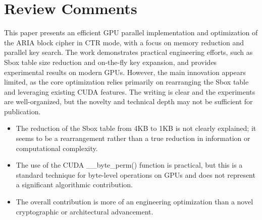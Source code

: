 \documentclass[a4paper]{article}
\begin{document}
\section{Review Comments}

This paper presents an efficient GPU parallel implementation and optimization of the ARIA block cipher in CTR mode, with a focus on memory reduction and parallel key search. The work demonstrates practical engineering efforts, such as Sbox table size reduction and on-the-fly key expansion, and provides experimental results on modern GPUs. However, the main innovation appears limited, as the core optimization relies primarily on rearranging the Sbox table and leveraging existing CUDA features. The writing is clear and the experiments are well-organized, but the novelty and technical depth may not be sufficient for publication.

\begin{itemize}
  \item The reduction of the Sbox table from 4KB to 1KB is not clearly explained; it seems to be a rearrangement rather than a true reduction in information or computational complexity.
  \item The use of the CUDA \_\_byte\_perm() function is practical, but this is a standard technique for byte-level operations on GPUs and does not represent a significant algorithmic contribution.
  \item The overall contribution is more of an engineering optimization than a novel cryptographic or architectural advancement.
\end{itemize}

% 
\end{document}
